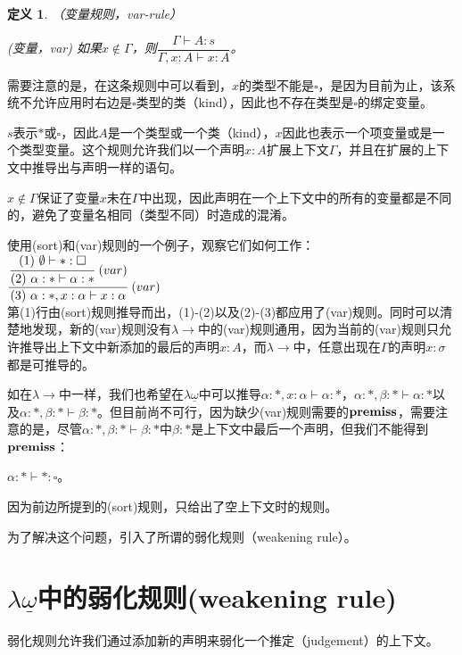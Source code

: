 \documentclass[UTF8]{article}
\newtheorem{thm}{定义}[section]
\begin{document}
		\begin{thm}（变量规则，var-rule）
			
			(变量，var) 如果$x\not\in\Gamma$，则$\dfrac{\Gamma\vdash A:s}{\Gamma,x:A\vdash x:A}$。
		\end{thm}

		需要注意的是，在这条规则中可以看到，$x$的类型不能是$\square$，是因为目前为止，该系统不允许应用时右边是$\square$类型的类（kind），因此也不存在类型是$\square$的绑定变量。

		$s$表示$*$或$\square$，因此$A$是一个类型或一个类（kind），$x$因此也表示一个项变量或是一个类型变量。这个规则允许我们以一个声明$x:A$扩展上下文$\Gamma$，并且在扩展的上下文中推导出与声明一样的语句。

		$x\not\in\Gamma$保证了变量$x$未在$\Gamma$中出现，因此声明在一个上下文中的所有的变量都是不同的，避免了变量名相同（类型不同）时造成的混淆。

		使用(sort)和(var)规则的一个例子，观察它们如何工作：\\

		$\cfrac{\cfrac{(1)\ \emptyset\vdash*:\square}{(2)\ \alpha:*\vdash\alpha:*}\ (var)}{(3)\ \alpha:*,x:\alpha\vdash x:\alpha}\ (var)$\\
		
		第(1)行由(sort)规则推导而出，(1)-(2)以及(2)-(3)都应用了(var)规则。同时可以清楚地发现，新的(var)规则没有$\lambda{\rightarrow}$中的(var)规则通用，因为当前的(var)规则只允许推导出上下文中新添加的最后的声明$x:A$，而$\lambda{\rightarrow}$中，任意出现在$\Gamma$的声明$x:\sigma$都是可推导的。
		
		如在$\lambda\rightarrow$中一样，我们也希望在$\lambda{\underline{\omega}}$中可以推导$\alpha:*,x:\alpha\vdash\alpha:*$，$\alpha:*,\beta:*\vdash\alpha:*$以及$\alpha:*,\beta:*\vdash\beta:*$。但目前尚不可行，因为缺少(var)规则需要的$\bf premiss$，需要注意的是，尽管$\alpha:*,\beta:*\vdash\beta:*$中$\beta:*$是上下文中最后一个声明，但我们不能得到$\bf premiss$：
		
		$\alpha:*\vdash*:\square$。
		
		因为前边所提到的(sort)规则，只给出了空上下文时的规则。
		
		为了解决这个问题，引入了所谓的弱化规则（weakening rule）。
		
	\section{$\lambda{\underline{\omega}}$中的弱化规则(weakening rule)}
		\noindent
		弱化规则允许我们通过添加新的声明来弱化一个推定（judgement）的上下文。
		
\end{document}
